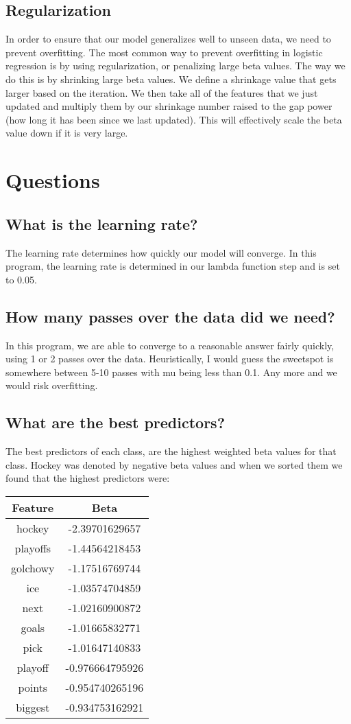 \documentclass{article}
\begin{document}
\subsection{Regularization}
In order to ensure that our model generalizes well to unseen data, we need to prevent overfitting. The most common way to prevent overfitting in logistic regression is by using regularization, or penalizing large beta values. The way we do this is by shrinking large beta values. We define a shrinkage value that gets larger based on the iteration. We then take all of the features that we just updated and multiply them by our shrinkage number raised to the gap power (how long it has been since we last updated). This will effectively scale the beta value down if it is very large. 

\section{Questions}

\subsection{What is the learning rate?}
The learning rate determines how quickly our model will converge. In this program, the learning rate is determined in our lambda function step and is set to 0.05.

\subsection{How many passes over the data did we need?}
In this program, we are able to converge to a reasonable answer fairly quickly, using 1 or 2 passes over the data. Heuristically, I would guess the sweetspot is somewhere between 5-10 passes with mu being less than 0.1. Any more and we would risk overfitting.

\subsection{What are the best predictors?}
The best predictors of each class, are the highest weighted beta values for that class. Hockey was denoted by negative beta values and when we sorted them we found that the highest predictors were:

\begin{tabular}{|c|c|}
  Feature & Beta \\
  \hline
  hockey & -2.39701629657 \\
  playoffs & -1.44564218453 \\
  golchowy & -1.17516769744 \\
  ice & -1.03574704859 \\
  next & -1.02160900872 \\
  goals & -1.01665832771 \\
  pick & -1.01647140833 \\
  playoff & -0.976664795926 \\
  points & -0.954740265196 \\
  biggest & -0.934753162921 \\
  
\end{tabular}
\end{document}
